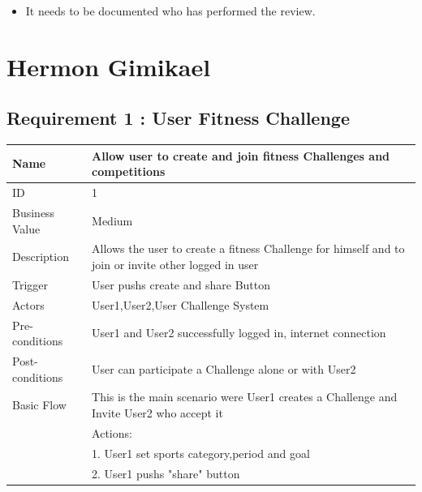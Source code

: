 \documentclass{article}
\begin{document}
\begin{itemize}
\item
  It needs to be documented who has performed the review.
\end{itemize}
\newpage

\section{Hermon Gimikael}
\subsection{Requirement 1 : User Fitness Challenge}

\begin{table}[h!]
    \begin{tabularx}{\textwidth}{|>{\raggedright\arraybackslash}p{}|X|}
        \hline
        Name             & Allow user to create and join fitness Challenges and competitions                               \\ \hline
        ID               & 1                                                                                   \\ \hline
        Business Value   & Medium                                                                                  \\ \hline
        Description      & Allows the user to create a fitness Challenge for himself and to join or invite other logged in user\\ \hline
        Trigger          & User pushs create and share Button \\ \hline
        Actors           & User1,User2,User Challenge System                        \\ \hline
        Pre-conditions   & User1 and User2 successfully logged in, internet connection                                  \\ \hline
        Post-conditions  & User can participate a Challenge alone or with User2                                                        \\ \hline
        Basic Flow       & This is the main scenario were User1 creates a Challenge and Invite User2 who accept it\\ \hline
                         & Actions: \\
                         & 1. User1 set sports category,period and goal\\
                         & 2. User1 pushs "share" button \\

\end{tabularx}
\end{table}
\end{document}
